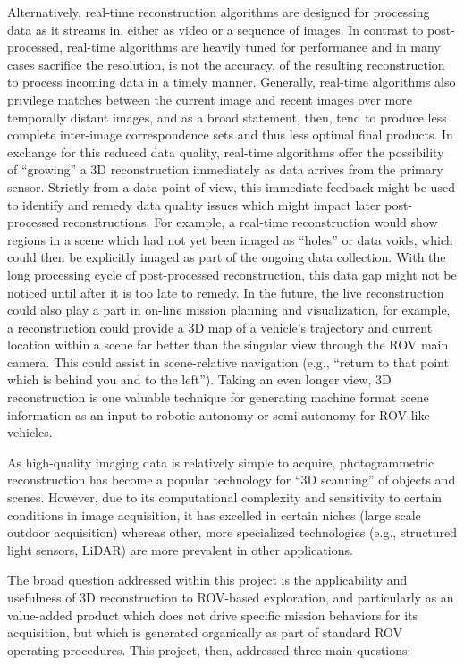 \documentclass[letterpaper,12pt]{article}
\begin{document}
Alternatively, real-time reconstruction algorithms are designed for processing data as it streams in, either as video or a sequence of images.   In contrast to post-processed, real-time algorithms are heavily tuned for performance and in many cases sacrifice the resolution, is not the accuracy, of the resulting reconstruction to process incoming data in a timely manner.   Generally, real-time algorithms also privilege matches between the current image and recent images over more temporally distant images, and as a broad statement, then, tend to produce less complete inter-image correspondence sets and thus less optimal final products.   In exchange for this reduced data quality, real-time algorithms offer the possibility of ``growing'' a 3D reconstruction immediately as data arrives from the primary sensor.    Strictly from a data point of view, this immediate feedback might be used to identify and remedy data quality issues which might impact later post-processed reconstructions.  For example, a real-time reconstruction would show regions in a scene which had not yet been imaged as ``holes'' or data voids, which could then be explicitly imaged as part of the ongoing data collection.   With the long processing cycle of post-processed reconstruction, this data gap might not be noticed until after it is too late to remedy.  In the future, the live reconstruction could also play a part in on-line mission planning and visualization, for example, a reconstruction could provide a 3D map of a vehicle's trajectory and current location within a scene far better than the singular view through the ROV main camera.  This could assist in scene-relative navigation (e.g., ``return to that point which is behind you and to the left'').    Taking an even longer view, 3D reconstruction is one valuable technique for generating machine format scene information as an input to robotic autonomy or semi-autonomy for ROV-like vehicles.  

As high-quality imaging data is relatively simple to acquire, photogrammetric reconstruction has become a popular technology for ``3D scanning'' of objects and scenes.  However, due to its computational complexity and sensitivity to certain conditions in image acquisition, it has excelled in certain niches (large scale outdoor acquisition) whereas other, more specialized technologies (e.g., structured light sensors, LiDAR) are more prevalent in other applications.    

The broad question addressed within this project is the applicability and usefulness of 3D reconstruction to ROV-based exploration, and particularly as an value-added product which does not drive specific mission behaviors for its acquisition, but which is generated organically as part of standard ROV operating procedures.  This project, then, addressed three main questions:
\end{document}
